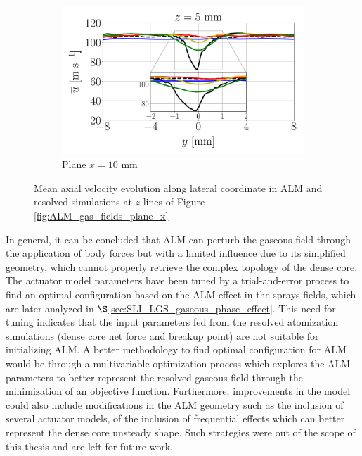 \begin{figure}[ht]
\begin{subfigure}[b]{1.0\textwidth}
   \includegraphics[scale=0.24]{./part2_developments/figures_ch6_lagrangian_JICF/gas_field_initial_conditions/ALM_line_x10_z05p0_ux_mean_along_y}
   \vspace*{-0.1in}
	\caption{Plane $x = 10$ mm}
\end{subfigure}
   \caption{Mean axial velocity evolution along lateral coordinate in ALM and resolved simulations at $z$ lines of Figure \ref{fig:ALM_gas_fields_plane_x}}
\label{fig:JICF_ALM_lines_iso-x_along_y_ux_mean}
\end{figure}

In general, it can be concluded that ALM can  perturb the gaseous field through the application of body forces but with a limited influence due to its simplified geometry, which cannot properly retrieve the complex topology of the dense core. The actuator model parameters have been tuned by a trial-and-error process to find an optimal configuration based on the ALM effect in the sprays fields, which are later analyzed in $\S$\ref{sec:SLI_LGS_gaseous_phase_effect}. This need for tuning indicates that the input parameters fed from the resolved atomization simulations (dense core net force and breakup point) are not suitable for initializing ALM. A better methodology to find optimal configuration for ALM would be through a multivariable optimization process which explores the ALM parameters to better represent the resolved gaseous field through the minimization of an objective function. Furthermore, improvements in the model could also include modifications in the ALM geometry such as the inclusion of several actuator models, of the inclusion of frequential effects which can better represent the dense core unsteady shape. Such strategies were out of the scope of this thesis and are left for future work. 


